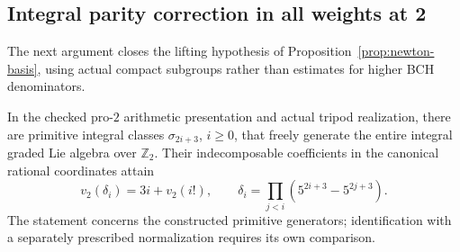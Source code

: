 \subsection{Integral parity correction in all weights at 2}

The next argument closes the lifting hypothesis of
Proposition~\ref{prop:newton-basis}, using actual compact
subgroups rather than estimates for higher BCH denominators.

\begin{theorem}[K17-2-ALL]\label{thm:2-allweights}
In the checked pro-$2$ arithmetic presentation and actual
tripod realization, there are primitive integral classes
$\sigma_{2i+3}$, $i\geq0$, that freely generate the entire
integral graded Lie algebra over $\mathbb Z_2$.
Their indecomposable coefficients in the canonical rational
coordinates attain
\[
 v_2(\delta_i)=3i+v_2(i!),\qquad
 \delta_i=\prod_{j<i}(5^{2i+3}-5^{2j+3}).
\]
The statement concerns the constructed primitive generators;
identification with a separately prescribed normalization
requires its own comparison.
\end{theorem}

